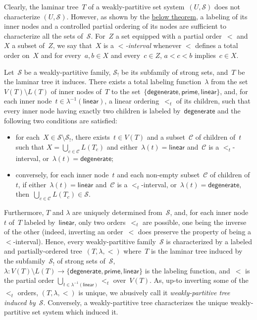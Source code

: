 \documentclass{lmcs} %
\newcommand*\defd[2][\em\color{red!25!black}]{{#1#2}}
\newcommand*\strong[2][\bfseries\mathversion{bold}]{{#1#2}}
\newcommand\DEGENERATE{\ensuremath{\mathsf{degenerate}}\xspace}
\newcommand\PRIME{\ensuremath{\mathsf{prime}}\xspace}
\newcommand\LINEAR{\ensuremath{\mathsf{linear}}\xspace}
\begin{document}
Clearly, the laminar tree~$T$ of a weakly-partitive set system~$(U,\mathcal{S})$ does not characterize $(U,\mathcal{S})$.
However,
as shown by the \hyperref[thm:weakly-partitive tree]{below theorem},
a labeling of its inner nodes and a controlled partial ordering of its nodes
are sufficient to characterize all the sets of~$\mathcal{S}$.
%
For~$Z$ a set equipped with a partial order~$<$
and~$X$ a subset of~$Z$,
we say that~$X$ is a \defd{$<$-interval}
whenever $<$ defines a total order on~$X$
and for every~$a,b\in X$ and every~$c\in Z$,
$a<c<b$ implies~$c\in X$.%
\begin{thmC}
    \label{thm:weakly-partitive tree}%
    Let~$\mathcal{S}$ be a weakly-partitive family,
    $\mathcal{S}_!$ be its subfamily of strong sets,
    and~$T$ be the laminar tree it induces.
    There exists a total labeling function~$\lambda$
    from the set~$V(T)\setminus L(T)$ of inner nodes of~$T$
    to the set~$\{\DEGENERATE,\PRIME,\LINEAR\}$,
    and, for each inner node~$t\in\lambda^{-1}(\LINEAR)$,
    a linear ordering~$<_t$ of its children,
    such that
    every inner node having exactly two children is labeled by~$\DEGENERATE$ and the following two conditions are satisfied:
    \begin{itemize}[nosep]
        \item for each~$X\in\mathcal{S}\setminus\mathcal{S}_!$,
            there exists~$t\in V(T)$
            and a subset~$\mathcal{C}$ of children of~$t$
            such that $X=\bigcup_{c\in\mathcal{C}}L(T_c)$
            and
            either~$\lambda(t)=\LINEAR$
            and~$\mathcal{C}$ is a $<_t$-interval,
            or~$\lambda(t)=\DEGENERATE$;
        \item conversely,
            for each inner node~$t$
            and each non-empty subset~$\mathcal{C}$ of children of~$t$,
            if
            either~$\lambda(t)=\LINEAR$
            and~$\mathcal{C}$ is a $<_t$-interval,
            or~$\lambda(t)=\DEGENERATE$,
            then~$\bigcup_{c\in\mathcal{C}}L(T_c)\in\mathcal{S}$.
    \end{itemize}
\end{thmC}
Furthermore, $T$ and $\lambda$ are uniquely determined from~$\mathcal{S}$,
and, for each inner node~$t$ of~$T$ labeled by~$\LINEAR$, only two orders~$<_t$ are possible,
one being the inverse of the other
(indeed, inverting an order~$<$ does preserve the property of being a $<$-interval).
Hence, every weakly-partitive family~$\mathcal{S}$ is characterized
by a labeled and partially-ordered tree~$(T,\lambda,<)$
where~$T$ is the laminar tree induced by the subfamily~$\mathcal{S}_!$ of strong sets of~$\mathcal{S}$,
$\lambda:V(T)\setminus L(T)\to\{\DEGENERATE,\PRIME,\LINEAR\}$ is the labeling function,
and~$<$ is the partial order $\bigcup_{t\in\lambda^{-1}(\LINEAR)}<_t$ over~$V(T)$.
As, up-to inverting some of the $<_t$ orders, $(T,\lambda,<)$ is unique,
we abusively call it \defd{\strong{the} weakly-partitive tree induced by~$\mathcal{S}$}.
Conversely, a weakly-partitive tree characterizes the unique weakly-partitive set system which induced it.
\end{document}
